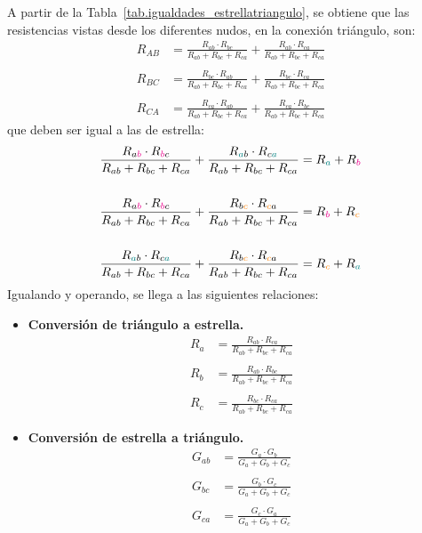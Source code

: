 \documentclass[11pt]{book} %
\numberwithin{dummy}{section}
\theoremstyle{ocrenumbox}
\theoremstyle{blacknumex}
\theoremstyle{blacknumbox}
\theoremstyle{ocrenum}
\begin{document}
	A partir de la Tabla~\ref{tab.igualdades_estrellatriangulo}, se obtiene que las resistencias vistas desde los diferentes nudos, en la conexión triángulo, son:
	\begin{align*}
		R_{AB} &= \frac{R_{ab} \cdot R_{bc}}{R_{ab} + R_{bc} + R_{ca}} + \frac{R_{ab} \cdot R_{ca}}{R_{ab} + R_{bc} + R_{ca}}\\
		\\
		R_{BC} &= \frac{R_{bc} \cdot R_{ab}}{R_{ab} + R_{bc} + R_{ca}} + \frac{R_{bc} \cdot R_{ca}}{R_{ab} + R_{bc} + R_{ca}}\\
		\\
		R_{CA} &= \frac{R_{ca} \cdot R_{ab}}{R_{ab} + R_{bc} + R_{ca}} + \frac{R_{ca} \cdot R_{bc}}{R_{ab} + R_{bc} + R_{ca}}
	\end{align*}
	que deben ser igual a las de estrella:
	\begin{align*}
		\dfrac{R_{a{\color{magenta}b}} \cdot R_{{\color{magenta}b}c}}{R_{ab} + R_{bc} + R_{ca}} + \dfrac{R_{{\color{teal}a}b} \cdot R_{c{\color{teal}a}}}{R_{ab} + R_{bc} + R_{ca}} &= R_{\color{teal}a} + R_{\color{magenta}b}\\
		\\
		\dfrac{R_{a{\color{magenta}b}} \cdot R_{{\color{magenta}b}c}}{R_{ab} + R_{bc} + R_{ca}} + \dfrac{R_{b{\color{orange}c}} \cdot R_{{\color{orange}c}a}}{R_{ab} + R_{bc} + R_{ca}} &= R_{\color{magenta}b} + R_{\color{orange}c}\\
		\\
		\dfrac{R_{{\color{teal}a}b} \cdot R_{c{\color{teal}a}}}{R_{ab} + R_{bc} + R_{ca}} + \dfrac{R_{b{\color{orange}c}} \cdot R_{{\color{orange}c}a}}{R_{ab} + R_{bc} + R_{ca}} &= R_{\color{orange}c} + R_{\color{teal}a}
	\end{align*}
	Igualando y operando, se llega a las siguientes relaciones: 
	\begin{itemize}
		\item \textbf{Conversión de triángulo a estrella.} 
		\begin{align*}
			R_a &= \frac{R_{ab} \cdot R_{ca}}{R_{ab} + R_{bc} + R_{ca}}\\
			\\
			R_b &= \frac{R_{ab} \cdot R_{bc}}{R_{ab} + R_{bc} + R_{ca}}\\
			\\
			R_c &= \frac{R_{bc} \cdot R_{ca}}{R_{ab} + R_{bc} + R_{ca}}
		\end{align*}
		\item \textbf{Conversión de estrella a triángulo.}
		\begin{align*}
			G_{ab} &= \frac{G_a \cdot G_b}{G_a + G_b + G_c}\\
			\\
			G_{bc} &= \frac{G_b \cdot G_c}{G_a + G_b + G_c}\\
			\\
			G_{ca} &= \frac{G_c \cdot G_a}{G_a + G_b + G_c}
		\end{align*}
	\end{itemize}
	
\end{document}
